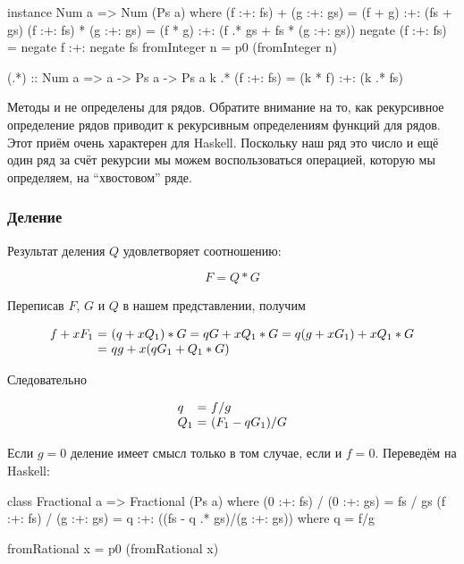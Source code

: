 \begin{code}
instance Num a => Num (Ps a) where
    (f :+: fs) + (g :+: gs) = (f + g) :+: (fs + gs)
    (f :+: fs) * (g :+: gs) = (f * g) :+: (f .* gs + fs * (g :+: gs))
    negate (f :+: fs) = negate f :+: negate fs
    fromInteger n = p0 (fromInteger n)


(.*) :: Num a => a -> Ps a -> Ps a
k .* (f :+: fs) = (k * f) :+: (k .* fs)  
\end{code}

Методы  и  не определены для рядов. Обратите внимание
на то, как рекурсивное определение рядов приводит к рекурсивным
определениям функций для рядов. Этот приём очень характерен для Haskell.
Поскольку наш ряд это число и ещё один ряд за счёт рекурсии мы можем
воспользоваться операцией, которую мы определяем, на ``хвостовом'' ряде.

\subsubsection{Деление}

Результат деления $Q$ удовлетворяет соотношению:

\[F = Q * G\]

Переписав $F$, $G$ и $Q$ в нашем представлении, получим

\[\begin{array}{l@{\ = \ }l}
f + x F_1 &  (q + x Q_1) * G = qG + x Q_1 * G = q(g + x G_1) + x Q_1 * G \\
          & q g + x (q G_1 + Q_1 * G) \\
\end{array}\]

Следовательно

\[\begin{array}{l@{\ = \ }l}
q    &  f/g  \\
Q_1  &  (F_1 - q G_1)/G \\
\end{array}\]

Если $g = 0$ деление имеет смысл только в том случае, если и $f = 0$.
Переведём на Haskell:


\begin{code}
class Fractional a => Fractional (Ps a) where
    (0 :+: fs) / (0 :+: gs) = fs / gs
    (f :+: fs) / (g :+: gs) = q :+: ((fs - q .* gs)/(g :+: gs))
        where q = f/g

    fromRational x = p0 (fromRational x)
\end{code}

